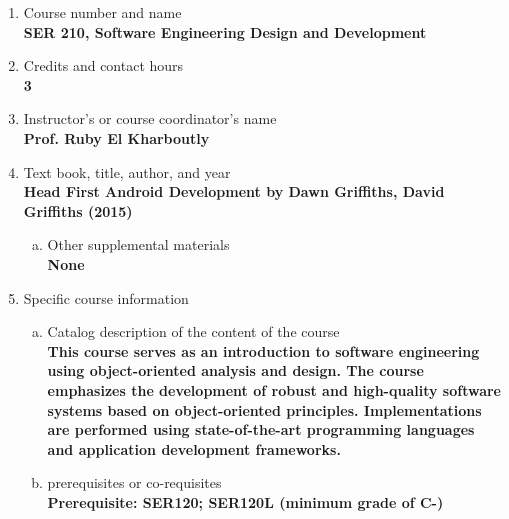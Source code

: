 \label{SER210}  %
\begin{enumerate}[1.]
\item Course number and name\\
  {\bfseries
SER 210, Software Engineering Design and Development
  }

\item Credits and contact hours\\
  {\bfseries
3
  }

\item Instructor's or course coordinator's name\\
  {\bfseries
Prof. Ruby El Kharboutly
  }

\item Text book, title, author, and year\\
  {\bfseries
    Head First Android Development by Dawn Griffiths, David Griffiths (2015)
  }
\begin{enumerate}[a.]
\item Other supplemental materials\\
  {\bfseries
    None
  }
\end{enumerate}

\item Specific course information
\begin{enumerate}[a.]
\item Catalog description of the content of the course\\
  {\bfseries
This course serves as an introduction to software engineering using object-oriented analysis and
design. The course emphasizes the development of robust and high-quality software systems based on
object-oriented principles. Implementations are performed using state-of-the-art programming
languages and application development frameworks.
  }

\item prerequisites or co-requisites\\
  {\bfseries
    Prerequisite: SER120; SER120L (minimum grade of C-)
  }


\end{enumerate}
\end{enumerate}

